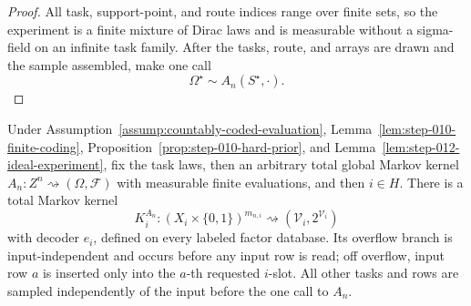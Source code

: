 \begin{proof}
All task, support-point, and route indices range over finite sets, so the
experiment is a finite mixture of Dirac laws and is measurable without a
sigma-field on an infinite task family.  After the tasks, route, and arrays
are drawn and the sample assembled, make one call
\begin{equation}\label{eq:step-012-ideal-output}
\Omega^\star\sim A_n(S^\star,\cdot).
\end{equation}
\end{proof}

\begin{proposition}
\label{prop:step-012-hidden-kernel}
Under Assumption~\ref{assump:countably-coded-evaluation},
Lemma~\ref{lem:step-010-finite-coding},
Proposition~\ref{prop:step-010-hard-prior}, and
Lemma~\ref{lem:step-012-ideal-experiment}, fix the task laws, then an
arbitrary total global Markov kernel
\(A_n:Z^n\rightsquigarrow(\Omega,\mathscr F)\) with measurable finite
evaluations, and then \(i\in H\).  There is a total Markov kernel
\begin{equation}\label{eq:step-012-hidden-kernel}
K_i^{A_n}:
(X_i\times\{0,1\})^{m_{n,i}}
\rightsquigarrow(\mathcal V_i,2^{\mathcal V_i})
\end{equation}
with decoder \(e_i\), defined on every labeled factor database.  Its
overflow branch is input-independent and occurs before any input row is
read; off overflow, input row \(a\) is inserted only into the \(a\)-th
requested \(i\)-slot.  All other tasks and rows are sampled independently
of the input before the one call to \(A_n\).
\end{proposition}

